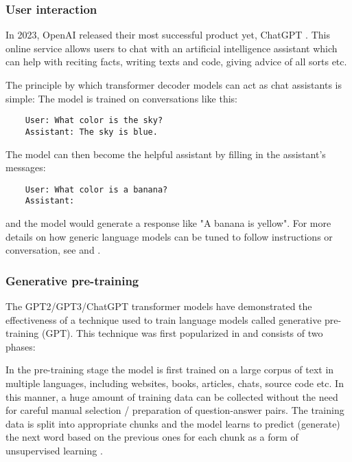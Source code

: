 \subsubsection{User interaction}

In 2023, OpenAI released their most successful product yet, ChatGPT \cite{openai_chatgpt_2022}. This online service allows users to chat with an artificial intelligence assistant which can help with reciting facts, writing texts and code, giving advice of all sorts etc.

The principle by which transformer decoder models can act as chat assistants is simple: The model is trained on conversations like this:

\begin{verbatim}
    User: What color is the sky?
    Assistant: The sky is blue.
\end{verbatim}

The model can then become the helpful assistant by filling in the assistant's messages:

\begin{verbatim}
    User: What color is a banana?
    Assistant:
\end{verbatim}

and the model would generate a response like "A banana is yellow". For more details on how generic language models can be tuned to follow instructions or conversation, see \cite{yi2019coherent} and \cite{ouyang2022training}.

\subsubsection{Generative pre-training}

The GPT2/GPT3/ChatGPT transformer models have demonstrated the effectiveness of a technique used to train language models called generative pre-training (GPT). This technique was first popularized in \cite{improvinglu} and consists of two phases:

In the pre-training stage the model is first trained on a large corpus of text in multiple languages, including websites, books, articles, chats, source code etc. In this manner, a huge amount of training data can be collected without the need for careful manual selection / preparation of question-answer pairs. The training data is split into appropriate chunks and the model learns to predict (generate) the next word based on the previous ones for each chunk as a form of unsupervised learning .

